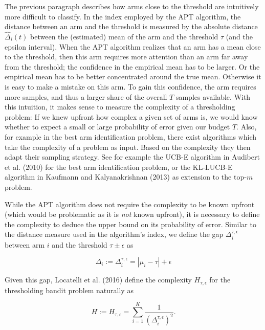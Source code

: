 \documentclass[11pt,]{article}
\begin{document}
The previous paragraph describes how arms close to the threshold are
intuitively more difficult to classify. In the index employed by the APT
algorithm, the distance between an arm and the threshold is measured by
the absolute distance \(\hat{\Delta}_i(t)\) between the (estimated) mean
of the arm and the threshold \(\tau\) (and the epsilon interval). When
the APT algorithm realizes that an arm has a mean close to the
threshold, then this arm requires more attention than an arm far away
from the threshold; the confidence in the empirical mean has to be
larger. Or the empirical mean has to be better concentrated around the
true mean. Otherwise it is easy to make a mistake on this arm. To gain
this confidence, the arm requires more samples, and thus a larger share
of the overall \(T\) samples available. With this intuition, it makes
sense to measure the complexity of a thresholding problem: If we knew
upfront how complex a given set of arms is, we would know whether to
expect a small or large probability of error given our budget \(T\).
Also, for example in the best arm identification problem, there exist
algorithms which take the complexity of a problem as input. Based on the
complexity they then adapt their sampling strategy. See for example the
UCB-E algorithm in Audibert et al. (2010) for the best arm
identification problem, or the KL-LUCB-E algorithm in Kaufmann and
Kalyanakrishnan (2013) as extension to the top-\(m\) problem.

While the APT algorithm does not require the complexity to be known
upfront (which would be problematic as it is \emph{not} known upfront),
it is necessary to define the complexity to deduce the upper bound on
its probability of error. Similar to the distance measure used in the
algorithm's index, we define the gap \(\Delta_i^{\tau,\epsilon}\)
between arm \(i\) and the threshold \(\tau \pm \epsilon\) as

\[
\Delta_i := \Delta_i^{\tau,\epsilon} = |\mu_i - \tau| + \epsilon
\]

Given this gap, Locatelli et al. (2016) define the complexity
\(H_{\tau, \epsilon}\) for the thresholding bandit problem naturally as

\[
H := H_{\tau, \epsilon} = \sum_{i=1}^K \frac{1}{(\Delta_i^{\tau,\epsilon})^2}.
\]
\end{document}
